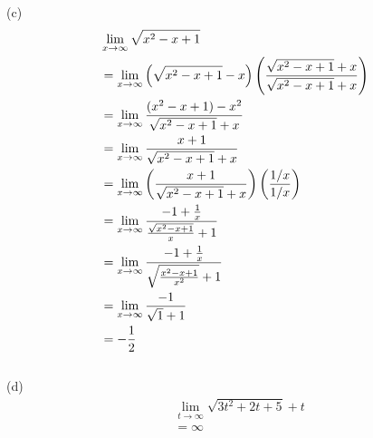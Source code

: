 \begin{exercise}
	(c)
	\begin{align}
		 & \lim\limits_{x \rightarrow \infty}{\sqrt{x^2 - x + 1}}                                                                    \\
		 & = \lim\limits_{x \rightarrow \infty}{\left(\sqrt{x^2-x+1}-x\right)\left({\sqrt{x^2-x+1}+x \over \sqrt{x^2-x+1}+x}\right)} \\
		 & = \lim\limits_{x \rightarrow \infty}{(x^2-x+1)-x^2 \over \sqrt{x^2-x+1}+x}                                                \\
		 & = \lim\limits_{x \rightarrow \infty}{x+1 \over \sqrt{x^2-x+1}+x}                                                          \\
		 & = \lim\limits_{x \rightarrow \infty}{\left({x+1 \over \sqrt{x^2-x+1}+x}\right)\left({1/x \over 1/x}\right)}               \\
		 & = \lim\limits_{x \rightarrow \infty}{-1 + {1 \over x} \over {\sqrt{x^2-x+1} \over x} + 1}                                 \\
		 & = \lim\limits_{x \rightarrow \infty}{-1 + {1 \over x} \over \sqrt{{x^2-x+1} \over x^2} + 1}                               \\
		 & = \lim\limits_{x \rightarrow \infty}{-1 \over \sqrt{1} + 1}                                                               \\
		 & = -{1 \over 2}
	\end{align}
	\\

	(d)
	\begin{align}
		 & \lim\limits_{t \rightarrow \infty}{\sqrt{3t^2 + 2t + 5} + t} \\
		 & = \infty
	\end{align}
\end{exercise}